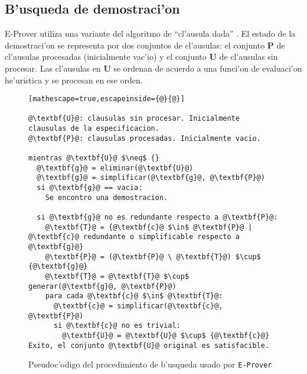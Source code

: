 \subsection{B'usqueda de demostraci'on}

E-Prover utiliza una variante del algoritmo de ``cl'ausula dada'' \cite{dk97}. El estado de la demostraci'on se representa por dos conjuntos de cl'ausulas: el conjunto \textbf{P} de cl'ausulas procesadas (inicialmente vac'io) y el conjunto \textbf{U} de cl'ausulas sin procesar. Las cl'ausulas en \textbf{U} se ordenan de acuerdo a una funci'on de evaluaci'on he'uristica y se procesan en ese orden.



\begin{figure}
\begin{lstlisting}[mathescape=true,escapeinside={@}{@}]

@\textbf{U}@: clausulas sin procesar. Inicialmente clausulas de la especificacion.
@\textbf{P}@: clausulas procesadas. Inicialmente vacio.

mientras @\textbf{U}@ $\neq$ {}
  @\textbf{g}@ = eliminar(@\textbf{U}@)
  @\textbf{g}@ = simplificar(@\textbf{g}@, @\textbf{P}@)
  si @\textbf{g}@ == vacia:
    Se encontro una demostracion.
  
  si @\textbf{g}@ no es redundante respecto a @\textbf{P}@:
    @\textbf{T}@ = {@\textbf{c}@ $\in$ @\textbf{P}@ | @\textbf{c}@ redundante o simplificable respecto a @\textbf{g}@}
    @\textbf{P}@ = (@\textbf{P}@ \ @\textbf{T}@) $\cup$ {@\textbf{g}@}
    @\textbf{T}@ = @\textbf{T}@ $\cup$ generar(@\textbf{g}@, @\textbf{P}@)
    para cada @\textbf{c}@ $\in$ @\textbf{T}@:
      @\textbf{c}@ = simplificar(@\textbf{c}@, @\textbf{P}@)
      si @\textbf{c}@ no es trivial:
        @\textbf{U}@ = @\textbf{U}@ $\cup$ {@\textbf{c}@}
Exito, el conjunto @\textbf{U}@ original es satisfacible.

\end{lstlisting}
\caption{Pseudoc'odigo del procedimiento de b'usqueda usado por \texttt{E-Prover}}
\label{fig:codigo_clausula_dada_eprover}
\end{figure}

